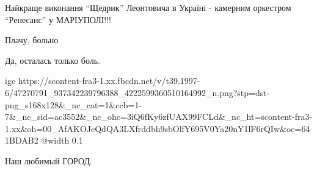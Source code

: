 Найкраще виконання \enquote{Щедрик} Леонтовича в Україні - камерним оркестром \enquote{Ренесанс} у МАРІУПОЛІ!!!


Плачу, больно


Да, осталась только боль.


\ifcmt
  igc https://scontent-fra3-1.xx.fbcdn.net/v/t39.1997-6/47270791_937342239796388_4222599360510164992_n.png?stp=dst-png_s168x128&_nc_cat=1&ccb=1-7&_nc_sid=ac3552&_nc_ohc=3iQ6fKy6zfUAX99FCLd&_nc_ht=scontent-fra3-1.xx&oh=00_AfAKOJeQdQA3LXfrddbh9sbOlfY695V0Ya20nY1lF6rQIw&oe=641BDAB2
	@width 0.1
\fi


Наш любимый ГОРОД.
